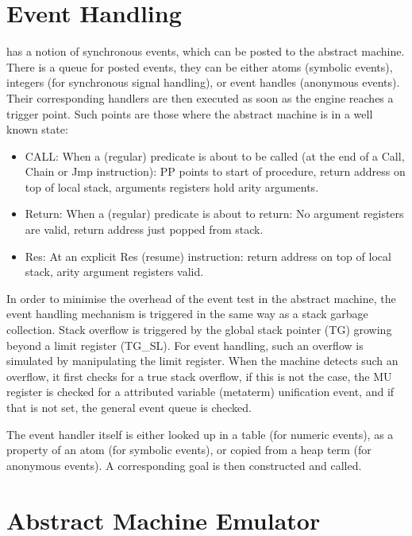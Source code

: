\section{Event Handling}
\label{seceventhandling}
{\eclipse} has a notion of synchronous  events, which can be posted to
the abstract machine.  There is a queue for posted events, they can be
either atoms (symbolic events), integers (for synchronous signal
handling), or event handles  (anonymous events).  Their corresponding
handlers are then executed as soon as the engine reaches a trigger
point.  Such points are those where the abstract machine is in a well
known state:
\begin{itemize}
\item CALL: When a (regular) predicate is about to be called (at the end of
a Call, Chain or Jmp instruction): PP points to start of procedure, return
address on top of local stack, arguments registers hold arity arguments.
\item Return: When a (regular) predicate is about to return:
No argument registers are valid, return address just popped from stack.
\item Res: At an explicit Res (resume) instruction: return address on top
of local stack, arity argument registers valid.
\end{itemize}
In order to minimise the overhead of the event test in the abstract machine, 
the event handling mechanism is triggered in the same way as a stack
garbage collection. Stack overflow is triggered by the global stack pointer
(TG) growing beyond a limit register (TG_SL).  For event handling, such an
overflow is simulated by manipulating the limit register.
When the machine detects such an overflow, it first checks for a true stack
overflow, if this is not the case, the MU  register is checked for a
attributed variable (metaterm) unification  event, and if that is not set,
the general event queue is checked.

The event handler itself is either looked up in a table (for numeric events),
as a property of an atom (for symbolic events), or copied from a heap term
(for anonymous events). A corresponding goal is then constructed and called.


\section{Abstract Machine Emulator}

